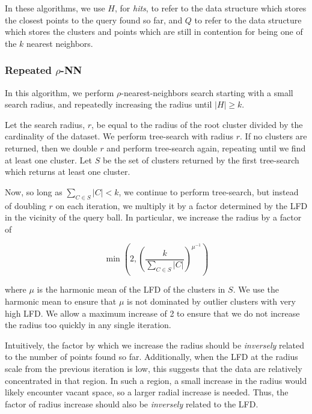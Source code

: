 In these algorithms, we use $H$, for \emph{hits}, to refer to the data structure which stores the closest points to the query found so far, and $Q$ to refer to the data structure which stores the clusters and points which are still in contention for being one of the $k$ nearest neighbors.


\subsubsection{Repeated \texorpdfstring{$\rho$}{p}-NN}
\label{sec:methods:knn-search:repeated-rnn}

In this algorithm, we perform $\rho$-nearest-neighbors search starting with a small search radius, and repeatedly increasing the radius until $|H| \geq k$.

Let the search radius, $r$, be equal to the radius of the root cluster divided by the cardinality of the dataset.
We perform tree-search with radius $r$.
If no clusters are returned, then we double $r$ and perform tree-search again, repeating until we find at least one cluster.
Let $S$ be the set of clusters returned by the first tree-search which returns at least one cluster.

Now, so long as $\sum_{C \in S} |C| < k$, we continue to perform tree-search, but instead of doubling $r$ on each iteration, we multiply it by a factor determined by the LFD in the vicinity of the query ball. 
In particular, we increase the radius by a factor of

\begin{equation}
    \min \left(2, \left( {\frac{k}{\sum_{C \in S} |C|}} \right)^{\mu^{-1}} \right)
    \label{eq:methods:repeated-rnn-factor}
\end{equation}

where $\mu$ is the harmonic mean of the LFD of the clusters in $S$.
We use the harmonic mean to ensure that $\mu$ is not dominated by outlier clusters with very high LFD.
We allow a maximum increase of 2 to ensure that we do not increase the radius too quickly in any single iteration.

Intuitively, the factor by which we increase the radius should be \emph{inversely} related to the number of points found so far. 
Additionally, when the LFD at the radius scale from the previous iteration is low, this suggests that the data are relatively concentrated in that region.
In such a region, a small increase in the radius would likely encounter vacant space, so a larger radial increase is needed.
Thus, the factor of radius increase should also be \emph{inversely} related to the LFD.

